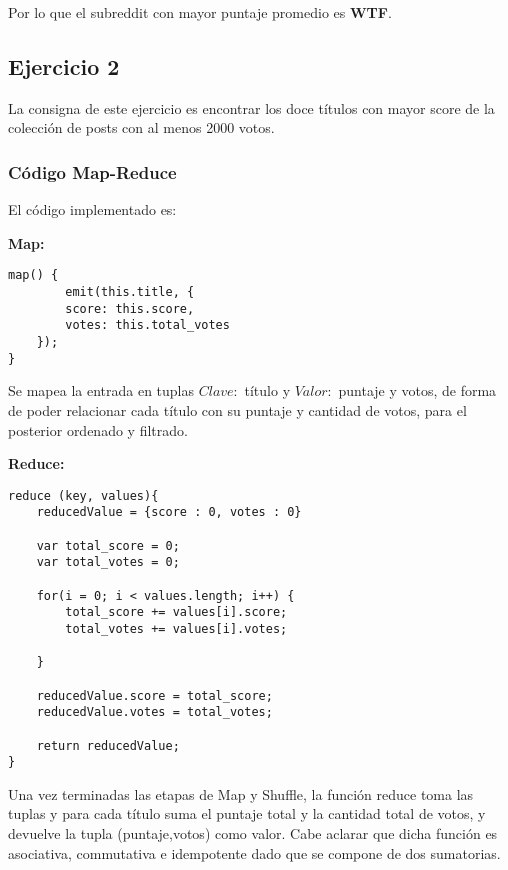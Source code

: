 Por lo que el subreddit con mayor puntaje promedio es \textbf{WTF}.

\subsection{Ejercicio 2}

La consigna de este ejercicio es encontrar los doce t\'itulos con mayor score de la colecci\'on de posts con al menos 2000 votos.

\subsubsection{C\'odigo Map-Reduce}

El c\'odigo implementado es:

\textbf{Map:}

\begin{lstlisting}
map() {
		emit(this.title, {
    	score: this.score,
    	votes: this.total_votes
    });
}
\end{lstlisting}

Se mapea la entrada en tuplas $Clave:$ t\'itulo y $Valor:$ puntaje y votos, de forma de poder relacionar cada t\'itulo con su puntaje y cantidad de votos, para el posterior ordenado y filtrado.

\vspace{2mm}

\textbf{Reduce:}

\begin{lstlisting}
reduce (key, values){
	reducedValue = {score : 0, votes : 0}
	
	var total_score = 0;
	var total_votes = 0;

	for(i = 0; i < values.length; i++) {
		total_score += values[i].score;
		total_votes += values[i].votes;

	}

	reducedValue.score = total_score;
	reducedValue.votes = total_votes;

    return reducedValue;
}

\end{lstlisting}

Una vez terminadas las etapas de Map y Shuffle, la funci\'on reduce toma las tuplas y para cada t\'itulo suma el puntaje total y la cantidad total de votos, y devuelve la tupla (puntaje,votos) como valor. Cabe aclarar que dicha funci\'on es asociativa, commutativa e idempotente dado que se compone de dos sumatorias.

\vspace{2mm}

